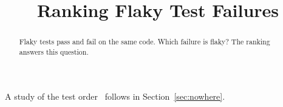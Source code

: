 \documentclass[conference]{IEEEtran}
\begin{document}
\title{Ranking Flaky Test Failures}
\author{}
\maketitle
\begin{abstract}
Flaky tests pass and fail on the same code. Which failure is flaky? The ranking answers this question.
\end{abstract}

A study of the test order~\cite{nowhere2020} follows in Section~\ref{sec:nowhere}.


\end{document}
